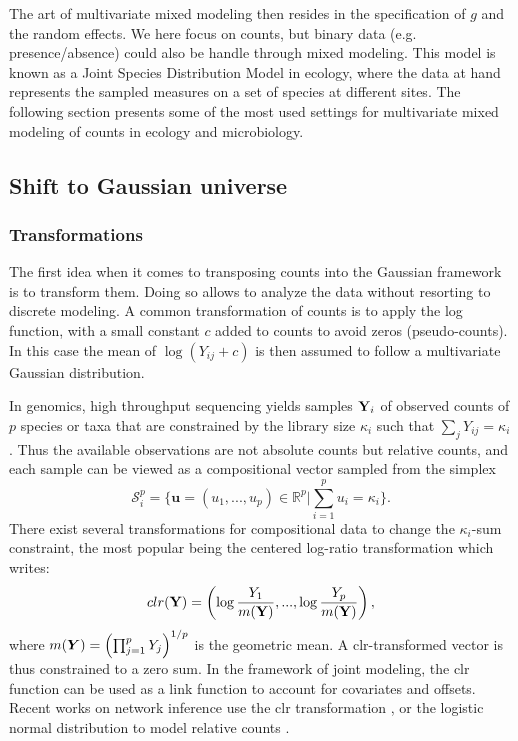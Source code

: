 The art of multivariate mixed modeling then resides in the specification of $g$ and the random effects. We here focus on counts, but binary data (e.g. presence/absence) could also be handle through mixed modeling. This model is known as a Joint Species Distribution Model in ecology,  where the data at hand represents the sampled measures on a set of species at different sites.  The following section presents some of the most used settings  for multivariate mixed modeling of counts in ecology and microbiology. 

\subsection{Shift to Gaussian universe} 
\subsubsection{Transformations}
The first idea when it comes to transposing counts into the Gaussian framework is to transform them. Doing so allows to analyze the data without resorting to discrete modeling. A common transformation of counts is to apply the log function, with a  small constant $c$ added to counts to avoid zeros (pseudo-counts). In this case the mean of $\log(Y_{ij}+c)$ is then assumed to follow a multivariate Gaussian distribution. 

In genomics, high throughput sequencing yields  samples ${\bf Y}_i$  of observed counts of $p$ species or taxa that are constrained by the library size $\kappa_i$ such that $\sum_j Y_{ij}=\kappa_i$ \citep{GMP17}. Thus the available observations are not absolute counts but relative counts, and each sample can be viewed as a compositional vector \citep{A82} sampled from the simplex
$$\mathcal{S}_i^p = \bigg\{ \boldsymbol{u}=(u_1,...,u_p)\in \mathds{R}^p\bigg\rvert\sum_{i=1}^p u_i = \kappa_i\bigg\}.$$
There exist several transformations for compositional data to change the $\kappa_i$-sum constraint, the most popular being the centered log-ratio transformation  which writes:
$$clr({\bf Y})=\left(\log \frac{Y_1}{m({\bf Y})}, ..., \log \frac{Y_p}{m({\bf Y})}\right), $$
where $m({\boldsymbol{Y}}) = \left(\prod_{j=1}^p Y_j \right)^{1/p}$ is the geometric mean. A clr-transformed vector is thus constrained to a zero sum.  In the framework of joint modeling, the clr function can be used as a link function to account for covariates and offsets. Recent works on network inference use the clr transformation  \citep{kurtz}, or the logistic normal distribution \citep{AS80} to model relative counts \citep{gcoda}.

